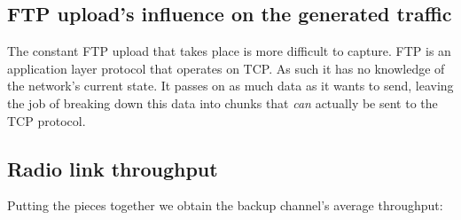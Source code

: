 \documentclass[a4paper]{scrreprt}
\begin{document}
			\subsection{FTP upload's influence on the generated traffic}
			The constant FTP upload that takes place is more difficult to capture. FTP is an application layer protocol that operates on TCP. As such it has no knowledge of the network's current state. It passes on as much data as it wants to send, leaving the job of breaking down this data into chunks that \emph{can} actually be sent to the TCP protocol. 
			
			
			
			\subsection{Radio link throughput}
			Putting the pieces together we obtain the backup channel's average throughput:
			
			
\end{document}
